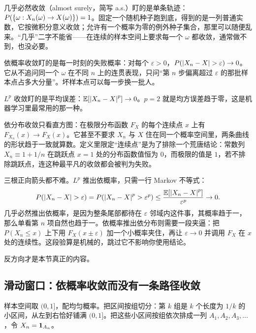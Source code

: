 几乎必然收敛（almost surely，简写 a.s.）盯的是单条轨迹：\(P(\left\{\omega: X_n(\omega)\to X(\omega)\right\})=1\)。固定一个随机种子跑到底，得到的是一列普通实数，它按微积分意义收敛；允许有一个概率为零的例外种子集合，那里可以随便乱来。``几乎''二字不能省——在连续的样本空间上要求每一个 \(\omega\) 都收敛，通常做不到，也没必要。

依概率收敛盯的是每一时刻的失败概率：对每个 \(\varepsilon>0\)，\(P(\abs{X_n-X}>\varepsilon)\to0\)。它从不追问同一个 \(\omega\) 在不同 \(n\) 上的连贯表现，只问``第 \(n\) 步偏离超过 \(\varepsilon\) 的那批样本点占多大分量''。坏样本点可以每一步换一批人。

\(L^p\) 收敛盯的是平均误差：\(\mathbb{E}[\left|X_n-X\right|^p]\to0\)。\(p=2\) 就是均方误差趋于零，这是机器学习里最常用的那一种。

依分布收敛只看直方图：在极限分布函数 \(F_X\) 的每个连续点 \(x\) 上有 \(F_{X_n}(x)\to F_X(x)\)。它甚至不要求 \(X_n\) 与 \(X\) 住在同一个概率空间里，两条曲线的形状趋于一致就算数。定义里限定``连续点''是为了排除一个荒唐结论：常数列 \(X_n\equiv1+1/n\) 在跳跃点 \(x=1\) 处的分布函数值恒为 \(0\)，而极限的值是 \(1\)，若不排除跳跃点，连这种最平凡的收敛都会被判为失败。

三根正向箭头都不难。\(L^p\) 推出依概率，只需一行 Markov 不等式：
\[
P(\abs{X_n-X}>\varepsilon)=P(\abs{X_n-X}^p>\varepsilon^p)\le\frac{\E[\abs{X_n-X}^p]}{\varepsilon^p}\to0.
\]
几乎必然推出依概率，是因为整条尾部都待在 \(\varepsilon\) 邻域内这件事，其概率趋于一，那么单看第 \(n\) 项自然也趋于一。依概率推出依分布则需要一段夹逼：把 \(P(X_n\le x)\) 上下用 \(F_X(x\pm\varepsilon)\) 加一个小概率夹住，再让 \(\varepsilon\to0\) 并调用 \(F_X\) 在 \(x\) 处的连续性。这段验算是机械的，跳过它不影响你使用结论。

反方向才是本节真正的内容。

\subsection{滑动窗口：依概率收敛而没有一条路径收敛}

样本空间取 \((0,1]\)，配均匀概率。把区间按组切分：第 \(k\) 组是 \(k\) 个长度为 \(1/k\) 的小区间，从左到右恰好铺满 \((0,1]\)。把这些小区间按组依次排成一列 \(A_1,A_2,A_3,\ldots\)，令 \(X_n=\mathbf{1}_{A_n}\)。

